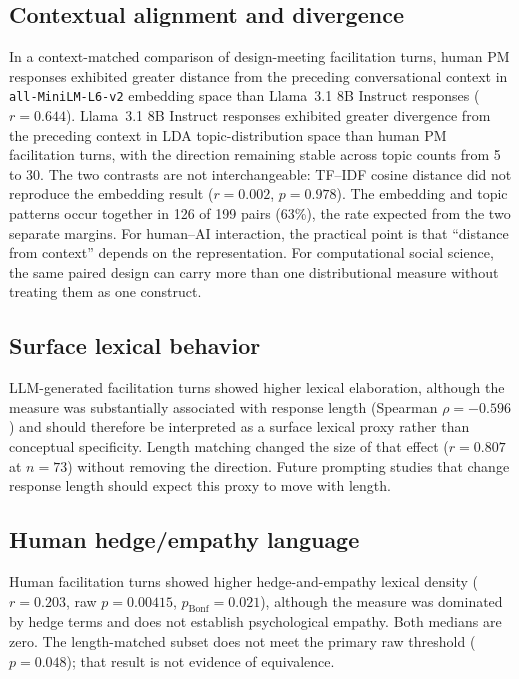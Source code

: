 \documentclass[10pt,journal,compsoc]{IEEEtran}
\begin{document}
\subsection{Contextual alignment and divergence}
In a context-matched comparison of design-meeting facilitation turns, human PM responses exhibited greater distance from the preceding conversational context in \texttt{all-MiniLM-L6-v2} embedding space than Llama~3.1 8B Instruct responses ($r = 0.644$). Llama~3.1 8B Instruct responses exhibited greater divergence from the preceding context in LDA topic-distribution space than human PM facilitation turns, with the direction remaining stable across topic counts from 5 to 30. The two contrasts are not interchangeable: TF--IDF cosine distance did not reproduce the embedding result ($r = 0.002$, $p = 0.978$). The embedding and topic patterns occur together in 126 of 199 pairs (63\%), the rate expected from the two separate margins. For human--AI interaction, the practical point is that ``distance from context'' depends on the representation. For computational social science, the same paired design can carry more than one distributional measure without treating them as one construct.

\subsection{Surface lexical behavior}
LLM-generated facilitation turns showed higher lexical elaboration, although the measure was substantially associated with response length (Spearman $\rho = -0.596$) and should therefore be interpreted as a surface lexical proxy rather than conceptual specificity. Length matching changed the size of that effect ($r = 0.807$ at $n = 73$) without removing the direction. Future prompting studies that change response length should expect this proxy to move with length.

\subsection{Human hedge/empathy language}
Human facilitation turns showed higher hedge-and-empathy lexical density ($r = 0.203$, raw $p = 0.00415$, $p_\text{Bonf} = 0.021$), although the measure was dominated by hedge terms and does not establish psychological empathy. Both medians are zero. The length-matched subset does not meet the primary raw threshold ($p = 0.048$); that result is not evidence of equivalence.
\end{document}
